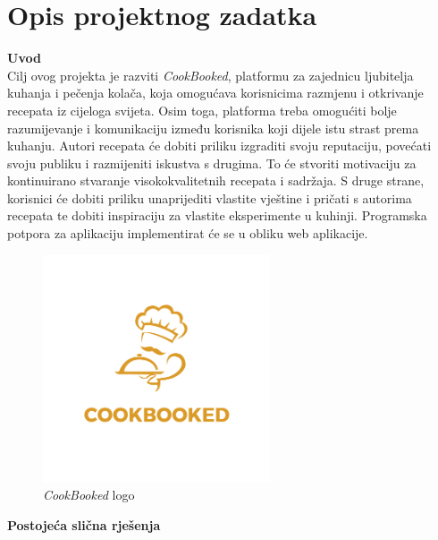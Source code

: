 \chapter{Opis projektnog zadatka}
		
		\noindent\textbf{Uvod}\\
		
		\noindent Cilj ovog projekta je razviti \textit{CookBooked}, platformu za zajednicu ljubitelja kuhanja i pečenja kolača, koja omogućava korisnicima razmjenu i otkrivanje recepata iz cijeloga svijeta. Osim toga, platforma treba omogućiti bolje razumijevanje i komunikaciju između korisnika koji dijele istu strast prema kuhanju. Autori recepata će dobiti priliku izgraditi svoju reputaciju, povećati svoju publiku i razmijeniti iskustva s drugima. To će stvoriti motivaciju za kontinuirano stvaranje visokokvalitetnih recepata i sadržaja. S druge strane, korisnici će dobiti priliku unaprijediti vlastite vještine i pričati s autorima recepata te dobiti inspiraciju za vlastite eksperimente u kuhinji. Programska potpora za aplikaciju implementirat će se u obliku web aplikacije.\\
		\begin{figure}[H]
			\centering
			\includegraphics[width=0.6\textwidth]{slike/CookBooked_logo.png} %
			\caption{\textit{CookBooked} logo}
			\label{fig:logo} %
		\end{figure}
		\eject

		\noindent\textbf{Postojeća slična rješenja}\\

